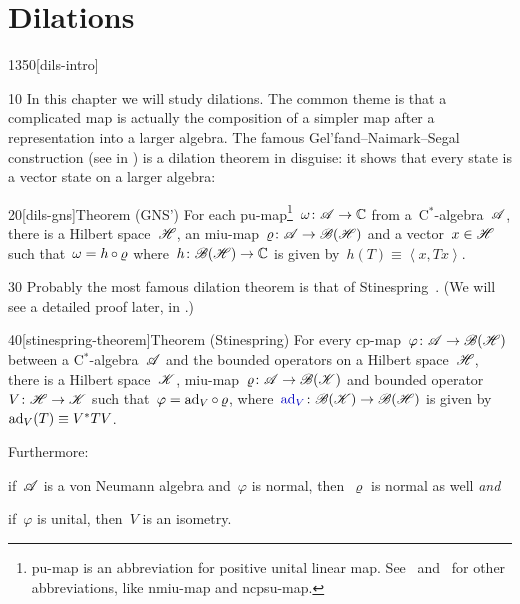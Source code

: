 
\chapter{Dilations}\label{chapter1}

\begin{parsec}{1350}[dils-intro]%
\begin{point}{10}%
In this chapter we will study dilations.
The common theme is that a complicated map
    is actually the composition of a simpler map
    after a representation into a larger algebra.
    The famous Gel'fand--Naimark--Segal construction (see 
        in \cite{bram})
    is a dilation theorem in disguise:
    it shows that every state is a vector state on a larger algebra:
\end{point}
\begin{point}{20}[dils-gns]{Theorem (GNS')}%
    For each pu-map\footnote{%
        pu-map is an abbreviation for positive unital linear map.
        See~ and~
            for other abbreviations, like nmiu-map
            and ncpsu-map.
        }~$\omega\colon \mathscr{A} \to \mathbb{C}$
        from a~C$^*$-algebra~$\mathscr{A}$,
    there is a Hilbert space~$\mathscr{H}$,
    an miu-map~$\varrho\colon \mathscr{A} \to \mathscr{B}(\mathscr{H})$
    and a vector~$x \in \mathscr{H}$
    such that~$\omega = h \mathop{\circ} \varrho$
    where~$h \colon \mathscr{B}(\mathscr{H}) \to \mathbb{C}$
    is given by~$h(T) \equiv \left<x,Tx\right>$.
\end{point}

\begin{point}{30}%
Probably the most famous dilation theorem is that
of Stinespring~\cite[Thm.~1]{stinespring}.
(We will see a detailed proof later, in .)
\end{point}

\begin{point}{40}[stinespring-theorem]{Theorem (Stinespring)}
    For every cp-map~$\varphi\colon \mathscr{A} \to \mathscr{B} (\mathscr{H})$
        between a C$^*$-algebra~$\mathscr{A}$
            and the bounded operators on a Hilbert space~$\mathscr{H}$,
    there is a Hilbert space~$\mathscr{K}$,
        miu-map~$\varrho\colon \mathscr{A} \to \mathscr{B}(\mathscr{K})$
        and bounded operator~$V\colon \mathscr{H} \to \mathscr{K}$
        such that~$\varphi = \mathrm{ad}_V \mathop{\circ} \varrho$,
        where~$\Define{\ad_V}\index{ad@$\ad_V$!Hilbert spaces} \colon \scrB(\scrK) \to \scrB(\scrH)$
        is given by~$\mathrm{ad}_V(T)\equiv V^*TV$.

Furthermore:
\begin{inparaenum}
\item
    if~$\mathscr{A}$ is a von Neumann algebra
    and~$\varphi$ is normal, then~$\varrho$ is normal as well \emph{and}
\item
    if~$\varphi$ is unital, then~$V$ is an isometry.
\end{inparaenum}
\end{point}


\end{parsec}
